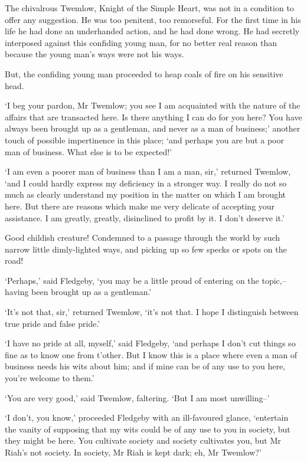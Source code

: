 The chivalrous Twemlow, Knight of the Simple Heart, was not in a
condition to offer any suggestion. He was too penitent, too remorseful.
For the first time in his life he had done an underhanded action, and he
had done wrong. He had secretly interposed against this confiding young
man, for no better real reason than because the young man’s ways were
not his ways.

But, the confiding young man proceeded to heap coals of fire on his
sensitive head.

‘I beg your pardon, Mr Twemlow; you see I am acquainted with the nature
of the affairs that are transacted here. Is there anything I can do for
you here? You have always been brought up as a gentleman, and never as a
man of business;’ another touch of possible impertinence in this place;
‘and perhaps you are but a poor man of business. What else is to be
expected!’

‘I am even a poorer man of business than I am a man, sir,’ returned
Twemlow, ‘and I could hardly express my deficiency in a stronger way. I
really do not so much as clearly understand my position in the matter
on which I am brought here. But there are reasons which make me
very delicate of accepting your assistance. I am greatly, greatly,
disinclined to profit by it. I don’t deserve it.’

Good childish creature! Condemned to a passage through the world by such
narrow little dimly-lighted ways, and picking up so few specks or spots
on the road!

‘Perhaps,’ said Fledgeby, ‘you may be a little proud of entering on the
topic,--having been brought up as a gentleman.’

‘It’s not that, sir,’ returned Twemlow, ‘it’s not that. I hope I
distinguish between true pride and false pride.’

‘I have no pride at all, myself,’ said Fledgeby, ‘and perhaps I don’t
cut things so fine as to know one from t’other. But I know this is a
place where even a man of business needs his wits about him; and if mine
can be of any use to you here, you’re welcome to them.’

‘You are very good,’ said Twemlow, faltering. ‘But I am most
unwilling--’

‘I don’t, you know,’ proceeded Fledgeby with an ill-favoured glance,
‘entertain the vanity of supposing that my wits could be of any use
to you in society, but they might be here. You cultivate society and
society cultivates you, but Mr Riah’s not society. In society, Mr Riah
is kept dark; eh, Mr Twemlow?’

